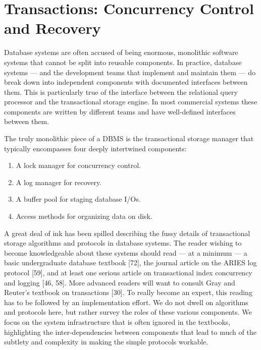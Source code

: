 \documentclass[b5paper,11pt,twoside,openright]{book}
\begin{document}
\hypertarget{transactions-concurrency-control-and-recovery}{%
\chapter{Transactions: Concurrency Control and
Recovery}\label{transactions-concurrency-control-and-recovery}}

Database systems are often accused of being enormous, monolithic
software systems that cannot be split into reusable components. In
practice, database systems --- and the development teams that implement
and maintain them --- do break down into independent components with
documented interfaces between them. This is particularly true of the
interface between the relational query processor and the transactional
storage engine. In most commercial systems these components are written
by different teams and have well-defined interfaces between them.

The truly monolithic piece of a DBMS is the transactional storage
manager that typically encompasses four deeply intertwined components:

\begin{enumerate}
\def\labelenumi{\arabic{enumi}.}
\item
  A lock manager for concurrency control.
\item
  A log manager for recovery.
\item
  A buffer pool for staging database I/Os.
\item
  Access methods for organizing data on disk.
\end{enumerate}

A great deal of ink has been spilled describing the fussy details of
transactional storage algorithms and protocols in database systems. The
reader wishing to become knowledgeable about these systems should read
--- at a minimum --- a basic undergraduate database textbook {[}72{]},
the journal article on the ARIES log protocol {[}59{]}, and at least one
serious article on transactional index concurrency and logging {[}46,
58{]}. More advanced readers will want to consult Gray and Reuter's
textbook on transactions {[}30{]}. To really become an expert, this
reading has to be followed by an implementation effort. We do not dwell
on algorithms and protocols here, but rather survey the roles of these
various components. We focus on the system infrastructure that is often
ignored in the textbooks, highlighting the inter-dependencies between
components that lead to much of the subtlety and complexity in making
the simple protocols workable.
\end{document}
